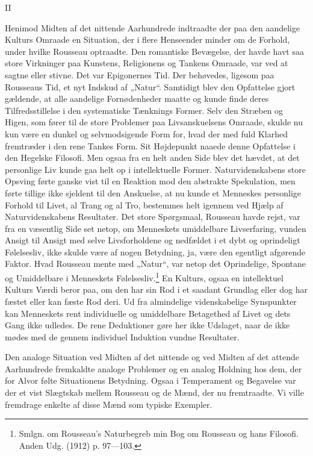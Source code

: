 \documentclass[12pt,a4paper,openany]{book}
\newcommand{\opage}[1]{\marginnote{\footnotesize\textit{[#1]}}}
\begin{document}
\begin{center}II\end{center}


Henimod Midten af det nittende Aarhundrede indtraadte
der paa den aandelige Kulturs Omraade en Situation, der i flere
Henseender minder om de Forhold, under hvilke Rousseau optraadte.
Den romantiske Bevægelse, der havde havt saa store
Virkninger paa Kunstens, Religionens og Tankens Omraade, var
ved at sagtne eller stivne. Det var Epigonernes Tid. Der behøvedes,
ligesom paa Rousseaus Tid, et nyt Indskud af „Natur“.
Samtidigt blev den Opfattelse gjort gældende, at alle aandelige
Fornødenheder maatte og kunde finde deres Tilfredsstillelse i
den systematiske Tænknings Former. Selv den Stræben og Higen,
som fører til de store Problemer paa Livsanskuelsens Omraade,
skulde nu kun være en dunkel og selvmodsigende Form for,
hvad der med fuld Klarhed fremtræder i den rene Tankes Form.
Sit Højdepunkt naaede denne Opfattelse i den Hegelske Filosofi.
Men ogsaa fra en helt anden Side blev det hævdet, at det personlige
Liv kunde gaa helt op i intellektuelle Former. Naturvidenskabens
store Opsving førte ganske vist til en Reaktion
\setcounter{footnote}{0}%
\opage{125}mod den abstrakte Spekulation, men førte tillige ikke sjeldent
til den Anskuelse, at nu kunde et Menneskes personlige Forhold
til Livet, al Trang og al Tro, bestemmes helt igennem
ved Hjælp af Naturvidenskabens Resultater. Det store Spørgsmaal,
Rousseau havde rejst, var fra en væsentlig Side set netop,
om Menneskets umiddelbare Livserfaring, vunden Ansigt til Ansigt
med selve Livsforholdene og nedfældet i et dybt og oprindeligt
Følelsesliv, ikke skulde være af nogen Betydning, ja,
være den egentligt afgørende Faktor. Hvad Rousseau mente med
„Natur“, var netop det Oprindelige, Spontane og Umiddelbare
i Menneskets Følelsesliv.\footnote[1]{Smlgn. om Rousseau’s Naturbegreb min Bog om Rousseau og hans Filosofi. Anden Udg. (1912) p. 97---103.} En Kulturs, ogsaa en intellektuel
Kulturs Værdi beror paa, om den har sin Rod i et saadant
Grundlag eller dog har fæstet eller kan fæste Rod deri. Ud fra
almindelige videnskabelige Synspunkter kan Menneskets rent
individuelle og umiddelbare Betagethed af Livet og dets Gang
ikke udledes. De rene Deduktioner gøre her ikke Udslaget, naar
de ikke mødes med de gennem individuel Induktion vundne
Resultater.

Den analoge Situation ved Midten af det nittende og ved
Midten af det attende Aarhundrede fremkaldte analoge Problemer
og en analog Holdning hos dem, der for Alvor følte Situationens
Betydning. Ogsaa i Temperament og Begavelse var der et vist
Slægtskab mellem Rousseau og de Mænd, der nu fremtraadte.
Vi ville fremdrage enkelte af disse Mænd som typiske Exempler.
\end{document}
